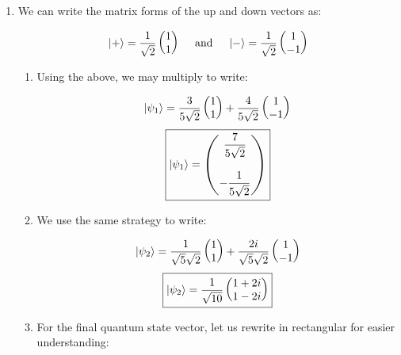 \begin{enumerate}
\begin{enumerate}
      \item We can write the matrix forms of the up and down vectors as:

        $$\ket{+}=\frac{1}{\sqrt{2}}\left( \begin{matrix} 1\\ 1\end{matrix} \right)\quad\text{ and }\quad\ket{-}=\frac{1}{\sqrt{2}}\left( \begin{matrix} 1\\ -1\end{matrix} \right)$$

        \begin{enumerate}

          \item Using the above, we may multiply to write:

            $$\ket{\psi_1}=\frac{3}{5\sqrt{2}}\left( \begin{matrix}1\\1\end{matrix} \right)+\frac{4}{5\sqrt{2}}\left( \begin{matrix} 1\\-1\end{matrix} \right)$$
            $$\boxed{\ket{\psi_1}=\left( \begin{matrix}\dfrac{7}{5\sqrt{2}}\\\\-\dfrac{1}{5\sqrt{2}}\end{matrix} \right)}$$

          \item We use the same strategy to write:

            $$\ket{\psi_2}=\frac{1}{\sqrt{5}\sqrt{2}}\left( \begin{matrix}1\\1\end{matrix} \right)+\frac{2i}{\sqrt{5}\sqrt{2}}\left( \begin{matrix} 1\\-1\end{matrix} \right)$$
            $$\boxed{\ket{\psi_2}=\frac{1}{\sqrt{10}}\left( \begin{matrix} 1+2i\\1-2i\end{matrix} \right)}$$

          \item For the final quantum state vector, let us rewrite in rectangular for easier understanding:


\end{enumerate}
\end{enumerate}
\end{enumerate}
